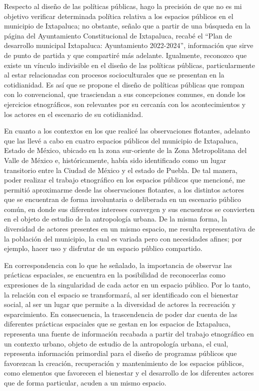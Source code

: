 \documentclass[
  spanish,
  11pt,
  a4paper,
]{scrbook}
\begin{document}
Respecto al diseño de las políticas públicas, hago la precisión de que
no es mi objetivo verificar determinada política relativa a los espacios
públicos en el municipio de Ixtapaluca; no obstante, señalo que a partir
de una búsqueda en la página del Ayuntamiento Constitucional de
Ixtapaluca, recabé el ``Plan de desarrollo municipal Ixtapaluca:
Ayuntamiento 2022-2024'', información que sirve de punto de partida y
que compartiré más adelante. Igualmente, reconozco que existe un vínculo
indivisible en el diseño de las políticas públicas, particularmente al
estar relacionadas con procesos socioculturales que se presentan en la
cotidianidad. Es así que se propone el diseño de políticas públicas que
rompan con lo convencional, que trasciendan a sus concepciones comunes,
en donde los ejercicios etnográficos, son relevantes por su cercanía con
los acontecimientos y los actores en el escenario de su cotidianidad.

En cuanto a los contextos en los que realicé las observaciones
flotantes, adelanto que las llevé a cabo en cuatro espacios públicos del
municipio de Ixtapaluca, Estado de México, ubicado en la zona
sur-oriente de la Zona Metropolitana del Valle de México e,
históricamente, había sido identificado como un lugar transitorio entre
la Ciudad de México y el estado de Puebla. De tal manera, poder realizar
el trabajo etnográfico en los espacios públicos que mencioné, me
permitió aproximarme desde las observaciones flotantes, a los distintos
actores que se encuentran de forma involuntaria o deliberada en un
escenario público común, en donde sus diferentes intereses convergen y
sus encuentros se convierten en el objeto de estudio de la antropología
urbana. De la misma forma, la diversidad de actores presentes en un
mismo espacio, me resulta representativa de la población del municipio,
la cual es variada pero con necesidades afines; por ejemplo, hacer uso y
disfrutar de un espacio público compartido.

En correspondencia con lo que he señalado, la importancia de observar
las prácticas espaciales, se encuentra en la posibilidad de reconocerlas
como expresiones de la singularidad de cada actor en un espacio público.
Por lo tanto, la relación con el espacio se transformará, al ser
identificado con el bienestar social, al ser un lugar que permite a la
diversidad de actores la recreación y esparcimiento. En consecuencia, la
trascendencia de poder dar cuenta de las diferentes prácticas espaciales
que se gestan en los espacios de Ixtapaluca, representa una fuente de
información recabada a partir del trabajo etnográfico en un contexto
urbano, objeto de estudio de la antropología urbana, el cual, representa
información primordial para el diseño de programas públicos que
favorezcan la creación, recuperación y mantenimiento de los espacios
públicos, como elementos que favorecen el bienestar y el desarrollo de
los diferentes actores que de forma particular, acuden a un mismo
espacio.
\end{document}
